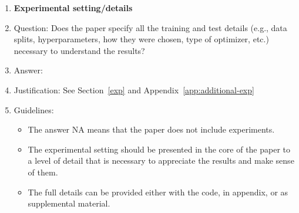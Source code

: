 \documentclass{article}
\theoremstyle{plain}
\theoremstyle{definition}
\theoremstyle{remark}
\begin{document}
\begin{enumerate}
\item {\bf Experimental setting/details}
    \item[] Question: Does the paper specify all the training and test details (e.g., data splits, hyperparameters, how they were chosen, type of optimizer, etc.) necessary to understand the results?
    \item[] Answer: \answerYes{} %
    \item[] Justification: See Section~\ref{exp} and Appendix~\ref{app:additional-exp}
    \item[] Guidelines:
    \begin{itemize}
        \item The answer NA means that the paper does not include experiments.
        \item The experimental setting should be presented in the core of the paper to a level of detail that is necessary to appreciate the results and make sense of them.
        \item The full details can be provided either with the code, in appendix, or as supplemental material.
    \end{itemize}


\end{enumerate}
\end{document}
